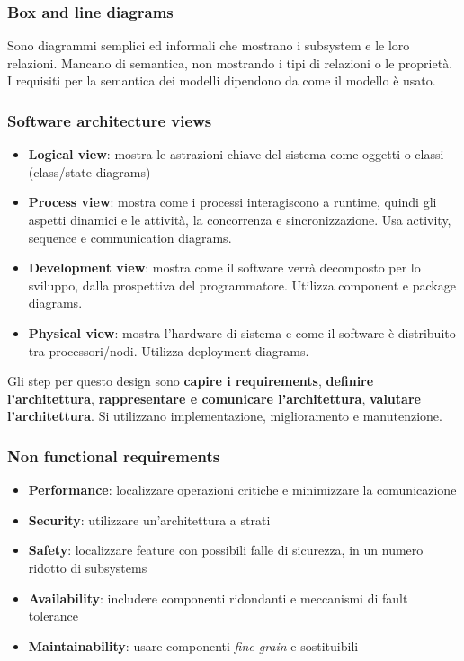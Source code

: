 \documentclass[11pt]{article}
\begin{document}
\subsubsection{Box and line diagrams}
Sono diagrammi semplici ed informali che mostrano i subsystem e le loro relazioni. Mancano di semantica, non mostrando i tipi di relazioni o le proprietà. I requisiti per la semantica dei modelli dipendono da come il modello è usato. 
\subsubsection{Software architecture views}
\begin{itemize}
    \item \textbf{Logical view}: mostra le astrazioni chiave del sistema come oggetti o classi (class/state diagrams)
    \item \textbf{Process view}: mostra come i processi interagiscono a runtime, quindi gli aspetti dinamici e le attività, la concorrenza e sincronizzazione. Usa activity, sequence e communication diagrams.
    \item \textbf{Development view}: mostra come il software verrà decomposto per lo sviluppo, dalla prospettiva del programmatore. Utilizza component e package diagrams.
    \item \textbf{Physical view}: mostra l'hardware di sistema e come il software è distribuito tra processori/nodi. Utilizza deployment diagrams.
\end{itemize}
Gli step per questo design sono \textbf{capire i requirements}, \textbf{definire l'architettura}, \textbf{rappresentare e comunicare l'architettura}, \textbf{valutare l'architettura}. Si utilizzano implementazione, miglioramento e manutenzione. 
\subsubsection{Non functional requirements}
\begin{itemize}
    \item \textbf{Performance}: localizzare operazioni critiche e minimizzare la comunicazione 
    \item \textbf{Security}: utilizzare un'architettura a strati 
    \item \textbf{Safety}: localizzare feature con possibili falle di sicurezza, in un numero ridotto di subsystems
    \item \textbf{Availability}: includere componenti ridondanti e meccanismi di fault tolerance
    \item \textbf{Maintainability}: usare componenti \textit{fine-grain} e sostituibili
\end{itemize}
\end{document}
